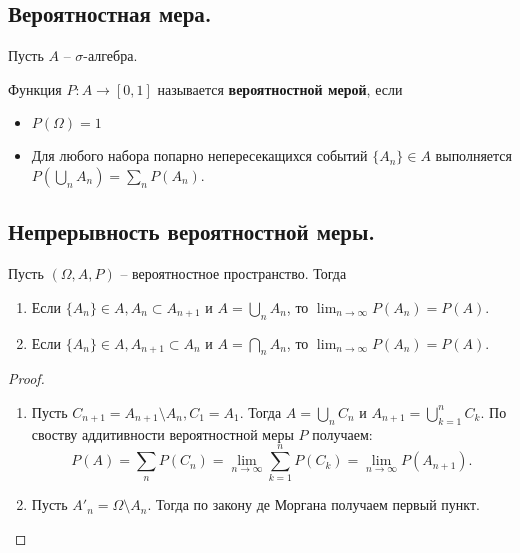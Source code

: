 \subsection{Вероятностная мера.}
Пусть $A$ -- $\sigma$-алгебра.
\begin{definition}
    Функция $P : A \to [0, 1]$ называется \textbf{вероятностной мерой}, если
    \begin{itemize}
        \item $P(\Omega) = 1$
        \item Для любого набора попарно непересекащихся событий $\{A_n\} \in A$ выполняется $P(\bigcup_n A_n) = \sum_n P(A_n)$.
    \end{itemize}
\end{definition}

\subsection{Непрерывность вероятностной меры.}
\begin{theorem}
    Пусть $(\Omega, A, P)$ -- вероятностное пространство. Тогда
    \begin{enumerate}
        \item Если $\{A_n\} \in A, A_n \subset A_{n+1}$ и $A = \bigcup_n A_n$, то $\lim_{n \to \infty} P(A_n) = P(A)$.
        \item Если $\{A_n\} \in A, A_{n+1} \subset A_n$ и $A = \bigcap_n A_n$, то $\lim_{n \to \infty} P(A_n) = P(A)$.
    \end{enumerate}
    \begin{proof}
        \text{}
        \begin{enumerate}
            \item Пусть $C_{n+1} = A_{n+1} \setminus A_n, C_1 = A_1$. Тогда $A = \bigcup_n C_n$ и $A_{n+1} = \bigcup_{k=1}^n C_k$. По своству аддитивности вероятностной меры $P$ получаем:
            \[
                P(A) = \sum_n P(C_n) = \lim_{n \to \infty} \sum_{k=1}^n P(C_k) = \lim_{n \to \infty} P(A_{n+1}).
            \]
            \item Пусть $A'_n = \Omega \setminus A_n$. Тогда по закону де Моргана получаем первый пункт.
        \end{enumerate}
    \end{proof}
\end{theorem}